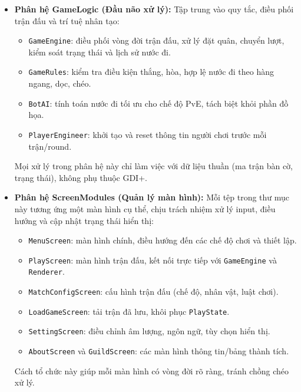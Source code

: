 \begin{itemize}
    \item \textbf{Phân hệ GameLogic (Đầu não xử lý):}
    Tập trung vào quy tắc, điều phối trận đấu và trí tuệ nhân tạo:
    \begin{itemize}
        \item \texttt{GameEngine}: điều phối vòng đời trận đấu, xử lý đặt quân, chuyển lượt, kiểm soát trạng thái và lịch sử nước đi.
        \item \texttt{GameRules}: kiểm tra điều kiện thắng, hòa, hợp lệ nước đi theo hàng ngang, dọc, chéo.
        \item \texttt{BotAI}: tính toán nước đi tối ưu cho chế độ PvE, tách biệt khỏi phần đồ họa.
        \item \texttt{PlayerEngineer}: khởi tạo và reset thông tin người chơi trước mỗi trận/round.
    \end{itemize}
    Mọi xử lý trong phân hệ này chỉ làm việc với dữ liệu thuần (ma trận bàn cờ, trạng thái), không phụ thuộc GDI+.

    \item \textbf{Phân hệ ScreenModules (Quản lý màn hình):}
    Mỗi tệp trong thư mục này tương ứng một màn hình cụ thể, chịu trách nhiệm xử lý input, điều hướng và cập nhật trạng thái hiển thị:
    \begin{itemize}
        \item \texttt{MenuScreen}: màn hình chính, điều hướng đến các chế độ chơi và thiết lập.
        \item \texttt{PlayScreen}: màn hình trận đấu, kết nối trực tiếp với \texttt{GameEngine} và \texttt{Renderer}.
        \item \texttt{MatchConfigScreen}: cấu hình trận đấu (chế độ, nhân vật, luật chơi).
        \item \texttt{LoadGameScreen}: tải trận đã lưu, khôi phục \texttt{PlayState}.
        \item \texttt{SettingScreen}: điều chỉnh âm lượng, ngôn ngữ, tùy chọn hiển thị.
        \item \texttt{AboutScreen} và \texttt{GuildScreen}: các màn hình thông tin/bảng thành tích.
    \end{itemize}
    Cách tổ chức này giúp mỗi màn hình có vòng đời rõ ràng, tránh chồng chéo xử lý.


\end{itemize}
